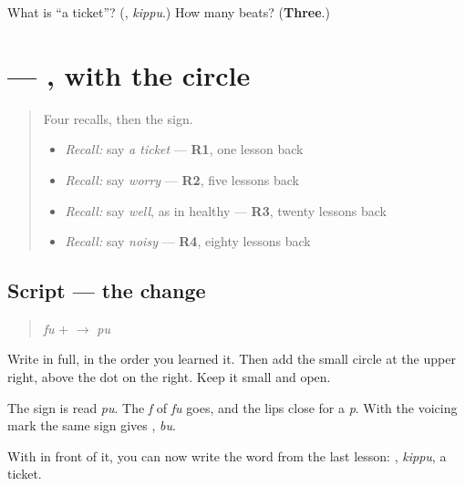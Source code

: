 \begin{tcolorbox}[breakable,colback=teal!4,colframe=teal!35!black,title={Before you move on}]
What is \textquotedblleft{}a ticket\textquotedblright{}? (\textbf{}, \emph{kippu}.) How many beats? (\textbf{Three}.)
\end{tcolorbox}
\section[\texorpdfstring{\ja{ぷ} (pu)}{ぷ (pu)}]{ — , with the circle}

\label{lesson:JA-W137-pu}



\begin{quote}
Four recalls, then the sign.

\begin{itemize}
\raggedright
  \item \emph{Recall:} say \emph{a ticket} — \textbf{R1}, one lesson back
  \item \emph{Recall:} say \emph{worry} — \textbf{R2}, five lessons back
  \item \emph{Recall:} say \emph{well}, as in healthy — \textbf{R3}, twenty lessons back
  \item \emph{Recall:} say \emph{noisy} — \textbf{R4}, eighty lessons back
\end{itemize}
\end{quote}

\subsection*{Script — the change}

\begin{quote}
\textbf{} \emph{fu} + \textbf{} $\to$ \textbf{} \emph{pu}
\end{quote}

Write \textbf{} in full, in the order you learned it. Then add the small circle at the upper right, above the dot on the right. Keep it small and open.

The sign is read \emph{pu}. The \emph{f} of \emph{fu} goes, and the lips close for a \emph{p}. With the voicing mark the same sign gives \textbf{}, \emph{bu}.

With \textbf{} in front of it, you can now write the word from the last lesson: \textbf{}, \emph{kippu}, a ticket.

